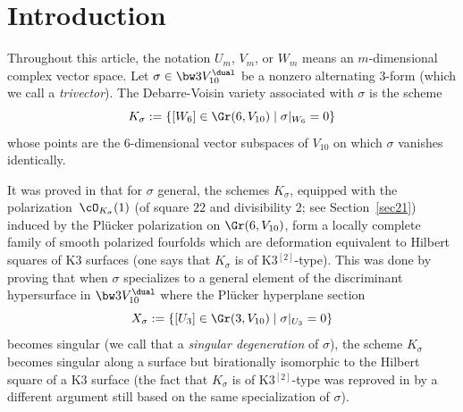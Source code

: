 \section{Introduction}
Throughout this article, the notation $U_m$, $V_m$, or $W_m$ means an $m$-dimensional complex vector space. Let $\sigma\in \bw3V_{10}^\dual$ be a nonzero alternating $3$-form (which we call a \emph{trivector}). The Debarre-Voisin variety associated with $\sigma$ is
the scheme
\begin{equation} \label{eqDV}
K_\sigma:=\{[W_6]\in \Gr(6,V_{10}) \mid \sigma\vert_{ W_6}=0\}
\end{equation}
whose points are the 6-dimensional vector subspaces of $V_{10}$ on which $\sigma$ vanishes identically.

It was proved in \cite{devo} that for $\sigma$ general, the schemes $K_\sigma$, equipped with the polarization~$\cO_{K_\sigma}(1)$ (of square $22$ and divisibility 2; see Section~\ref{sec21}) induced by the Plücker polarization on $\Gr(6,V_{10}) $, form a locally complete family
of smooth polarized \hk fourfolds which are deformation equivalent to Hilbert squares
of K3 surfaces (one says that $K_\sigma$ is of K3$^{[2]}$-type). This was done by proving that when $\sigma$ specializes to
a general element of
the discriminant hypersurface in $\bw3V_{10}^\dual$ where the Plücker hyperplane section
\begin{equation}\label{eqxs}
X_{\sigma}:=\{[U_3]\in \Gr(3,V_{10}) \mid \sigma\vert_{U_3}=0\}
\end{equation}
becomes singular (we call that a \emph{singular degeneration} of $\sigma$), the scheme $K_\sigma$ becomes singular along a surface but birationally isomorphic to the Hilbert square
of a K3 surface
(the fact that $K_\sigma$ is of K3$^{[2]}$-type was reproved in \cite{KLSV}
by a different argument still based on the same specialization of $\sigma$).

